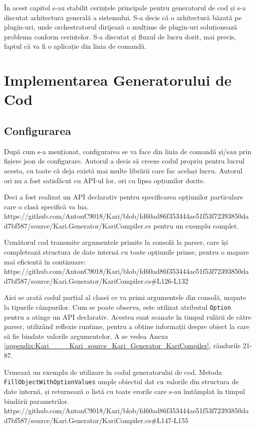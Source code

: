 \documentclass[a4paper,12pt]{report}
\begin{document}
În acest capitol s-au stabilit cerințele principale pentru generatorul de cod și s-a discutat arhitectura generală a sistemului.
S-a decis că o arhitectură băzată pe plugin-uri, unde orchestratorul dirijează o mulțime de plugin-uri soluționează problema conform cerințelor.
S-a discutat și fluxul de lucru dorit, mai precis, faptul că va fi o aplicație din linia de comandă.


\chapter{Implementarea Generatorului de Cod}

\section{Configurarea}

După cum s-a menționat, configurarea se va face din linia de comandă și/sau prin fișiere json de configurare.
Autorul a decis să creeze codul propriu pentru lucrul acesta, cu toate că deja există mai multe librării care fac același lucru.
Autorul ori nu a fost satisfăcut cu \ac{API}-ul lor, ori cu lipsa opțiunilor dorite.

Deci a fost realizat un \ac{API} declarativ pentru specificarea opțiunilor particulare care o clasă specifică va lua.
https://github.com/AntonC9018/Kari/blob/fd60ad86f353444ae51f53f72393850dad7bf587/source/Kari.Generator/KariCompiler.cs
pentru un exemplu complet.

Următorul cod transmite argumentele primite la consolă la parser, care își completează structura de date internă cu toate opțiunile prinse, pentru o mapare mai eficientă în continuare:
https://github.com/AntonC9018/Kari/blob/fd60ad86f353444ae51f53f72393850dad7bf587/source/Kari.Generator/KariCompiler.cs#L126-L132

Aici se arată codul parțial al clasei ce va primi argumentele din consolă, mapate la tipurile câmpurilor.
Cum se poate observa, este utilizat atributul \texttt{Option} pentru a atinge un \ac{API} declarativ.
Acestea sunt scanate în timpul rulării de către parser, utilizând reflexie runtime, pentru a obține informații despre obiect la care să fie bindate valorile argumentelor. 
A se vedea Anexa \ref{appendix:Kari____Kari_source_Kari_Generator_KariCompiler}, rândurile 21-87.

Urmează un exemplu de utilizare în codul generatorului de cod.
Metoda \texttt{FillObjectWithOptionValues} umple obiectul dat cu valorile din structura de date internă, și returnează o listă cu toate erorile care s-au îmtâmplat în timpul bindării parametrilor. 
https://github.com/AntonC9018/Kari/blob/fd60ad86f353444ae51f53f72393850dad7bf587/source/Kari.Generator/KariCompiler.cs#L147-L155
\end{document}
